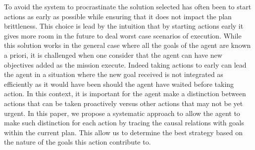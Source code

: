 To avoid the system to procrastinate the solution selected has often 
been to start actions as early as possible while ensuring that it does 
not impact the plan brittleness. This choice is lead by the intuition that by
starting actions early it gives more room in the future to deal worst
case scenarios of execution. While this solution works in the general 
case where all the goals of the agent are known a priori, it is
challenged when one consider that the agent can have new objectives
added as the mission execute. Indeed taking actions to early can lead
the agent in a situation where the new goal received is not integrated
as efficiently as it would have been should the agent have waited
before taking action. In this context, it is important for the agent
make a distinction between actions that can be taken proactively
versus other actions that may not be yet urgent.  In this paper, we
propose a systematic approach to allow the agent to make such
distinction for each action by tracing the causal relations with
 goals within the current plan.  This allow us to determine the best
 strategy based on the nature of the goals this action contribute to.


